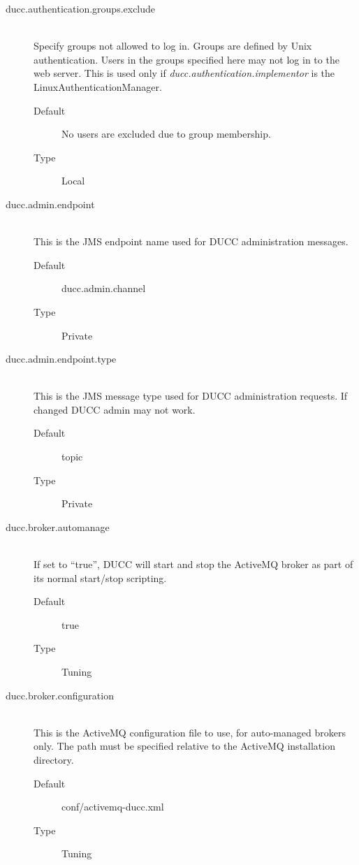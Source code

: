 \begin{description}
       \item[ducc.authentication.groups.exclude] \hfill \\
         Specify groups not allowed to log in.  Groups are defined by Unix authentication. 
         Users in the groups specified here may not log in to the web server.  This is used only
          if {\em ducc.authentication.implementor} is the LinuxAuthenticationManager.
         \begin{description}
           \item[Default] No users are excluded due to group membership.
           \item[Type] Local
         \end{description}

       \item[ducc.admin.endpoint] \hfill \\
         This is the JMS endpoint name used for DUCC administration messages. 
         \begin{description}
           \item[Default] ducc.admin.channel 
           \item[Type] Private 
         \end{description}

       \item[ducc.admin.endpoint.type] \hfill \\
         This is the JMS message type used for DUCC administration requests. If changed DUCC 
         admin may not work. 
         \begin{description}
           \item[Default] topic 
           \item[Type] Private
         \end{description} 
           
       \item[ducc.broker.automanage] \hfill \\
         If set to ``true'', DUCC will start and stop the ActiveMQ broker as part of its normal start/stop
         scripting.  
         \begin{description}
           \item[Default] true
           \item[Type] Tuning
         \end{description} 

       \item[ducc.broker.configuration] \hfill \\
         This is the ActiveMQ configuration file to use, for auto-managed brokers only.  The path
         must be specified relative to the ActiveMQ installation directory.
         \begin{description}
           \item[Default] conf/activemq-ducc.xml
           \item[Type] Tuning
         \end{description} 


\end{description}

